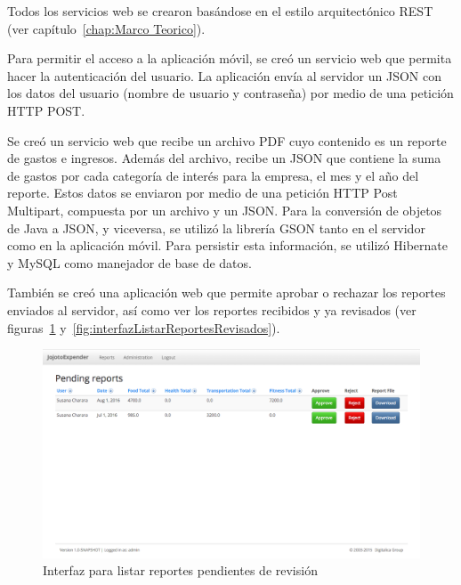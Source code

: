Todos los servicios web se crearon basándose en el estilo arquitectónico REST (ver capítulo~\ref{chap:Marco Teorico}). 

Para permitir el acceso a la aplicación móvil, se creó un servicio web que permita hacer la autenticación del usuario. La aplicación envía al servidor un JSON con los datos del usuario (nombre de usuario y contraseña) por medio de una petición HTTP POST.

Se creó un servicio web que recibe un archivo PDF cuyo contenido es un reporte de gastos e ingresos. Además del archivo, recibe un JSON que contiene la suma de gastos por cada categoría de interés para la empresa, el mes y el año del reporte. Estos datos se enviaron por medio de una petición HTTP Post Multipart, compuesta por un archivo y un JSON. Para la conversión de objetos de Java a JSON, y viceversa, se utilizó la librería GSON tanto en el servidor como en la aplicación móvil. Para persistir esta información, se utilizó Hibernate y MySQL como manejador de base de datos.

También se creó una aplicación web que permite aprobar o rechazar los reportes enviados al servidor, así como ver los reportes recibidos y ya revisados (ver figuras~\ref{fig:interfazListarReportesPendientes} y~\ref{fig:interfazListarReportesRevisados}). 

\begin{figure}[ht]
  \centering
  \includegraphics[scale=0.38,type=png,ext=.png,read=.png]{imagenes/pending_reports}
  \captionsetup{justification=centering}
  \caption{Interfaz para listar reportes pendientes de revisión}
  \label{fig:interfazListarReportesPendientes}
\end{figure}

